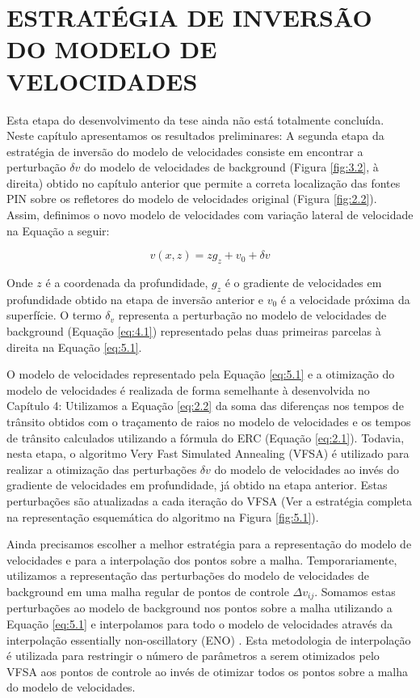 \chapter{ESTRATÉGIA DE INVERSÃO DO MODELO DE VELOCIDADES}
\label{cap5}

Esta etapa do desenvolvimento da tese ainda não está totalmente concluída. Neste capítulo apresentamos
os resultados preliminares:
A segunda etapa da estratégia de inversão do modelo de velocidades consiste em encontrar a perturbação
$\delta v$ do modelo de velocidades de background (Figura \ref{fig:3.2}, à direita)
obtido no capítulo anterior que permite a correta 
localização das fontes PIN sobre os refletores do modelo de velocidades original (Figura \ref{fig:2.2}).
Assim, definimos o novo modelo de velocidades com variação lateral de velocidade na
Equação a seguir:

\begin{equation}
\label{eq:5.1}
v(x,z)=z g_z+v_0+\delta v
\end{equation}

Onde $z$ é a coordenada da profundidade, $g_z$ é o gradiente de velocidades em profundidade obtido na
etapa de inversão anterior e $v_0$ é a velocidade próxima da superfície. O termo $\delta_v$ representa
a perturbação no modelo de velocidades de background (Equação \ref{eq:4.1})
representado pelas duas primeiras parcelas à direita na 
Equação \ref{eq:5.1}.

O modelo de velocidades representado pela Equação \ref{eq:5.1} e a
otimização do modelo de velocidades é realizada de forma semelhante à desenvolvida no Capítulo 4:
Utilizamos a Equação \ref{eq:2.2} da soma das diferenças nos tempos de trânsito obtidos com o traçamento de raios no modelo de velocidades e os tempos de trânsito calculados utilizando a fórmula do ERC (Equação \ref{eq:2.1}). Todavia, nesta etapa, o algoritmo Very Fast Simulated Annealing (VFSA) é utilizado para realizar a otimização das perturbações $\delta v$ do modelo de velocidades ao invés do gradiente de velocidades em
profundidade, já obtido na etapa anterior. Estas perturbações são atualizadas a cada iteração do VFSA (Ver a estratégia completa na representação esquemática do algoritmo na Figura \ref{fig:5.1}).

Ainda precisamos escolher a melhor estratégia para a representação do modelo de velocidades
e para a interpolação dos pontos sobre a malha. Temporariamente, utilizamos a representação
das perturbações do modelo de velocidades de background em uma malha regular de pontos de
controle $\Delta v_{ij}$. Somamos estas perturbações ao modelo de background nos pontos sobre
a malha utilizando a Equação \ref{eq:5.1} e interpolamos para todo o modelo de velocidades
através da interpolação essentially non-oscillatory (ENO) \cite{eno1,eno2}. Esta metodologia
de interpolação é utilizada para restringir o número de parâmetros a serem otimizados pelo VFSA
aos pontos de controle ao invés de otimizar todos os pontos sobre a malha do modelo de velocidades.

